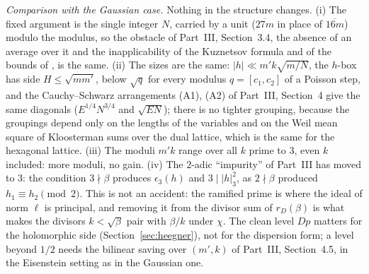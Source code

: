 \documentclass[11pt]{amsart}
\theoremstyle{remark}
\begin{document}
\emph{Comparison with the Gaussian case.} Nothing in the structure changes. (i) The fixed argument is the single integer $N$, carried by a unit ($\overline{27m}$ in place of $\overline{16m}$) modulo the modulus, so the obstacle of Part~III, Section~3.4, the absence of an average over it and the inapplicability of the Kuznetsov formula and of the bounds of \cite{DI,Drappeau}, is the same. (ii) The sizes are the same: $|h|\ll m'k\sqrt{m/N}$, the $h$-box has side $H\le\sqrt{mm'}$, below $\sqrt q$ for every modulus $q=[c_1,c_2]$ of a Poisson step, and the Cauchy--Schwarz arrangements (A1), (A2) of Part~III, Section~4 give the same diagonals ($E^{1/4}N^{3/4}$ and $\sqrt{EN}$); there is no tighter grouping, because the groupings depend only on the lengths of the variables and on the Weil mean square of Kloosterman sums over the dual lattice, which is the same for the hexagonal lattice. (iii) The moduli $m'k$ range over all $k$ prime to $3$, even $k$ included: more moduli, no gain. (iv) The $2$-adic ``impurity'' of Part~III has moved to $3$: the condition $3\nmid\beta$ produces $\epsilon_3(h)$ and $3\mid|h|_3^2$, as $2\nmid\beta$ produced $h_1\equiv h_2\pmod2$. This is not an accident: the ramified prime is where the ideal of norm $\ell$ is principal, and removing it from the divisor sum of $r_D(\beta)$ is what makes the divisors $k<\sqrt\beta$ pair with $\beta/k$ under $\chi$. The clean level $Dp$ matters for the holomorphic side (Section~\ref{sec:heegner}), not for the dispersion form; a level beyond $1/2$ needs the bilinear saving over $(m',k)$ of Part~III, Section~4.5, in the Eisenstein setting as in the Gaussian one.
\end{document}
